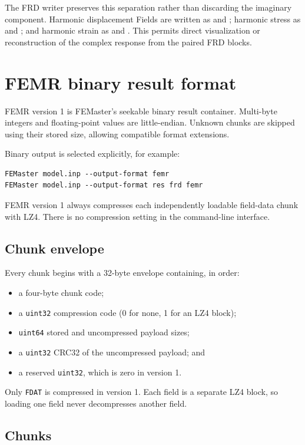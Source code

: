 The FRD writer preserves this separation rather than discarding the imaginary component. Harmonic displacement Fields are written as  and ; harmonic stress as  and ; and harmonic strain as  and . This permits direct visualization or reconstruction of the complex response from the paired FRD blocks.

\section{FEMR binary result format}
\label{sec:femr-format}

FEMR version 1 is FEMaster's seekable binary result container. Multi-byte integers and floating-point values are little-endian. Unknown chunks are skipped using their stored size, allowing compatible format extensions.

Binary output is selected explicitly, for example:
\begin{verbatim}
FEMaster model.inp --output-format femr
FEMaster model.inp --output-format res frd femr
\end{verbatim}
FEMR version 1 always compresses each independently loadable field-data chunk with LZ4. There is no compression setting in the command-line interface.

\subsection{Chunk envelope}

Every chunk begins with a 32-byte envelope containing, in order:
\begin{itemize}
  \item a four-byte chunk code;
  \item a \texttt{uint32} compression code (0 for none, 1 for an LZ4 block);
  \item \texttt{uint64} stored and uncompressed payload sizes;
  \item a \texttt{uint32} CRC32 of the uncompressed payload; and
  \item a reserved \texttt{uint32}, which is zero in version 1.
\end{itemize}
Only \texttt{FDAT} is compressed in version 1. Each field is a separate LZ4 block, so loading one field never decompresses another field.

\subsection{Chunks}

